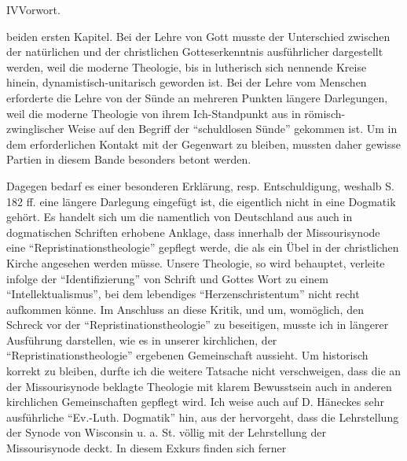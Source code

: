 IV\hfill Vorwort.\par\par beiden ersten Kapitel. Bei der Lehre von Gott musste der Unterschied zwischen der natürlichen und der christlichen Gotteserkenntnis ausführlicher dargestellt werden, weil die moderne Theologie, bis in lutherisch sich nennende Kreise hinein, dynamistisch-unitarisch geworden ist. Bei der Lehre vom Menschen erforderte die Lehre von der Sünde an mehreren Punkten längere Darlegungen, weil die moderne Theologie von ihrem Ich-Standpunkt aus in römisch-zwinglischer Weise auf den Begriff der \textquotedblleft schuldlosen Sünde\textquotedblright{} gekommen ist. Um in dem erforderlichen Kontakt mit der Gegenwart zu bleiben, mussten daher gewisse Partien in diesem Bande besonders betont werden.\par\par Dagegen bedarf es einer besonderen Erklärung, resp. Entschuldigung, weshalb S. 182 ff. eine längere Darlegung eingefügt ist, die eigentlich nicht in eine Dogmatik gehört. Es handelt sich um die namentlich von Deutschland aus auch in dogmatischen Schriften erhobene Anklage, dass innerhalb der Missourisynode eine \textquotedblleft Repristinationstheologie\textquotedblright{} gepflegt werde, die als ein Übel in der christlichen Kirche angesehen werden müsse. Unsere Theologie, so wird behauptet, verleite infolge der \textquotedblleft Identifizierung\textquotedblright{} von Schrift und Gottes Wort zu einem \textquotedblleft Intellektualismus\textquotedblright{}, bei dem lebendiges \textquotedblleft Herzenschristentum\textquotedblright{} nicht recht aufkommen könne. Im Anschluss an diese Kritik, und um, womöglich, den Schreck vor der \textquotedblleft Repristinationstheologie\textquotedblright{} zu beseitigen, musste ich in längerer Ausführung darstellen, wie es in unserer kirchlichen, der \textquotedblleft Repristinationstheologie\textquotedblright{} ergebenen Gemeinschaft aussieht. Um historisch korrekt zu bleiben, durfte ich die weitere Tatsache nicht verschweigen, dass die an der Missourisynode beklagte Theologie mit klarem Bewusstsein auch in anderen kirchlichen Gemeinschaften gepflegt wird. Ich weise auch auf D. Häneckes sehr ausführliche \textquotedblleft Ev.-Luth. Dogmatik\textquotedblright{} hin, aus der hervorgeht, dass die Lehrstellung der Synode von Wisconsin u. a. St. völlig mit der Lehrstellung der Missourisynode deckt. In diesem Exkurs finden sich ferner